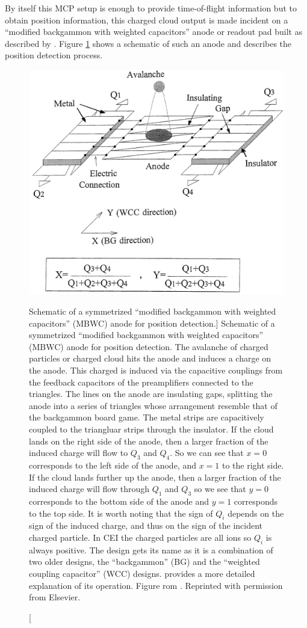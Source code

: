 By itself this MCP setup is enough to provide time-of-flight information but to obtain position information, this charged cloud output is made incident on a ``modified backgammon with weighted capacitors'' anode or readout pad built as described by \citet{Veshapidze02}. Figure \ref{fig:MBWC} shows a schematic of such an anode and describes the position detection process.

\begin{figure}
  \centering
  \includegraphics[width=\textwidth]{gfx/MBWC}
  \caption
  [Schematic of a symmetrized ``modified backgammon with weighted capacitors'' (MBWC) anode for position detection.]
  {Schematic of a symmetrized ``modified backgammon with weighted capacitors'' (MBWC) anode for position detection. The avalanche of charged particles or charged cloud hits the anode and induces a charge on the anode. This charged is induced via the capacitive couplings from the feedback capacitors of the preamplifiers connected to the triangles. The lines on the anode are insulating gaps, splitting the anode into a series of triangles whose arrangement resemble that of the backgammon board game. The metal strips are capacitively coupled to the triangluar strips through the insulator. If the cloud lands on the right side of the anode, then a larger fraction of the induced charge will flow to $Q_3$ and $Q_4$. So we can see that $x=0$ corresponds to the left side of the anode, and $x=1$ to the right side. If the cloud lands further up the anode, then a larger fraction of the induced charge will flow through $Q_1$ and $Q_3$ so we see that $y=0$ corresponds to the bottom side of the anode and $y=1$ corresponds to the top side. It is worth noting that the sign of $Q_i$ depends on the sign of the induced charge, and thus on the sign of the incident charged particle. In CEI the charged particles are all ions so $Q_i$ is always positive. The design gets its name as it is a combination of two older designs, the ``backgammon'' (BG) and the ``weighted coupling capacitor'' (WCC) designs. \citet{Mizogawa92} provides a more detailed explanation of its operation.  Figure rom \citet{Mizogawa02}. Reprinted with permission from Elsevier.}
  \label{fig:MBWC}
\end{figure}

